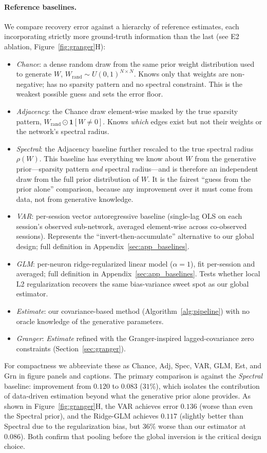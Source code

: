 \documentclass{article}
\begin{document}
\paragraph{Reference baselines.}
We compare recovery error against a hierarchy of reference estimates, each incorporating strictly more ground-truth information than the last (see E2 ablation, Figure~\ref{fig:granger}H):
\begin{itemize}
    \item \emph{Chance}: a dense random draw from the same prior weight distribution used to generate $W$, $W_{\mathrm{rand}} \sim U(0,1)^{N \times N}$. Knows only that weights are non-negative; has no sparsity pattern and no spectral constraint. This is the weakest possible guess and sets the error floor.
    \item \emph{Adjacency}: the Chance draw element-wise masked by the true sparsity pattern, $W_{\mathrm{rand}} \odot \mathbf{1}[W \neq 0]$. Knows \emph{which} edges exist but not their weights or the network's spectral radius.
    \item \emph{Spectral}: the Adjacency baseline further rescaled to the true spectral radius $\rho(W)$. This baseline has everything we know about $W$ from the generative prior---sparsity pattern \emph{and} spectral radius---and is therefore an independent draw from the full prior distribution of $W$. It is the fairest ``guess from the prior alone'' comparison, because any improvement over it must come from data, not from generative knowledge.
    \item \emph{VAR}: per-session vector autoregressive baseline (single-lag OLS on each session's observed sub-network, averaged element-wise across co-observed sessions). Represents the ``invert-then-accumulate'' alternative to our global design; full definition in Appendix~\ref{sec:app_baselines}.
    \item \emph{GLM}: per-neuron ridge-regularized linear model ($\alpha=1$), fit per-session and averaged; full definition in Appendix~\ref{sec:app_baselines}. Tests whether local L2 regularization recovers the same bias-variance sweet spot as our global estimator.
    \item \emph{Estimate}: our covariance-based method (Algorithm~\ref{alg:pipeline}) with no oracle knowledge of the generative parameters.
    \item \emph{Granger}: \emph{Estimate} refined with the Granger-inspired lagged-covariance zero constraints (Section~\ref{sec:granger}).
\end{itemize}
For compactness we abbreviate these as Chance, Adj, Spec, VAR, GLM, Est, and Grn in figure panels and captions.
The primary comparison is against the \emph{Spectral} baseline: improvement from $0.120$ to $0.083$ ($31\%$), which isolates the contribution of data-driven estimation beyond what the generative prior alone provides.
As shown in Figure~\ref{fig:granger}H, the VAR achieves error $0.136$ (worse than even the Spectral prior), and the Ridge-GLM achieves $0.117$ (slightly better than Spectral due to the regularization bias, but $36\%$ worse than our estimator at $0.086$). Both confirm that pooling before the global inversion is the critical design choice.
\end{document}
